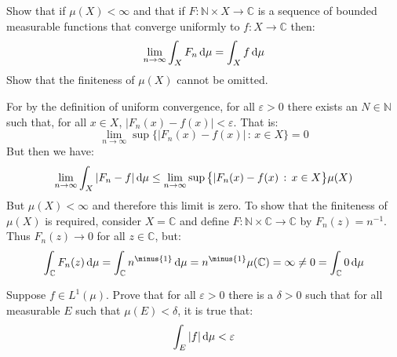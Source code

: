 \documentclass[crop=false,class=article]{standalone}                           %
\begin{document}
        \begin{problem}
            Show that if $\mu(X)<\infty$ and that if
            $F:\mathbb{N}\times{X}\rightarrow\mathbb{C}$ is a sequence of
            bounded measurable functions that converge uniformly to
            $f:X\rightarrow\mathbb{C}$ then:
            \begin{equation}
                \underset{n\rightarrow\infty}{\lim}\int_{X}F_{n}\mathop{}\!\mathrm{d}{\mu}
                =\int_{X}f\mathop{}\!\mathrm{d}{\mu}
            \end{equation}
            Show that the finiteness of $\mu(X)$ cannot be omitted.
        \end{problem}
        \begin{solution}
            For by the definition of uniform convergence, for all
            $\varepsilon>0$ there exists an $N\in\mathbb{N}$ such that, for all
            $x\in{X}$, $|F_{n}(x)-f(x)|<\varepsilon$. That is:
            \begin{equation}
                \underset{n\rightarrow\infty}{\lim}
                \sup\big\{|F_{n}(x)-f(x)|\,:\,x\in{X}\big\}=0
            \end{equation}
            But then we have:
            \begin{equation}
                \underset{n\rightarrow\infty}{\lim}\int_{X}|F_{n}-f|\mathop{}\!\mathrm{d}{\mu}
                \leq\underset{n\rightarrow\infty}{\lim}
                \sup\big\{|F_{n}(x)-f(x)\,:\,x\in{X}\big\}\mu(X)
            \end{equation}
            But $\mu(X)<\infty$ and therefore this limit is zero. To show that
            the finiteness of $\mu(X)$ is required, consider $X=\mathbb{C}$ and
            define $F:\mathbb{N}\times\mathbb{C}\rightarrow\mathbb{C}$ by
            $F_{n}(z)=n^{\minus{1}}$. Thus $F_{n}(z)\rightarrow{0}$ for all
            $z\in\mathbb{C}$, but:
            \begin{equation}
                \int_{\mathbb{C}}F_{n}(z)\diff{\mu}
                =\int_{\mathbb{C}}n^{\minus{1}}\diff{\mu}
                =n^{\minus{1}}\mu(\mathbb{C})
                =\infty
                \ne{0}
                =\int_{\mathbb{C}}0\diff{\mu}
            \end{equation}
        \end{solution}
        \begin{problem}
            Suppose $f\in{L}^{1}(\mu)$. Prove that for all $\varepsilon>0$ there
            is a $\delta>0$ such that for all measurable $E$ such that
            $\mu(E)<\delta$, it is true that:
            \begin{equation}
                \int_{E}|f|\mathop{}\!\mathrm{d}{\mu}<\varepsilon
            \end{equation}
        \end{problem}
\end{document}
